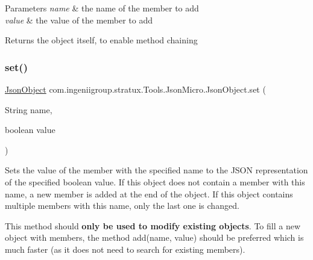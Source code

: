 \begin{DoxyParams}{Parameters}
{\em name} & the name of the member to add \\
\hline
{\em value} & the value of the member to add \\
\hline
\end{DoxyParams}
\begin{DoxyReturn}{Returns}
the object itself, to enable method chaining 
\end{DoxyReturn}
\mbox{\label{classcom_1_1ingeniigroup_1_1stratux_1_1_tools_1_1_json_micro_1_1_json_object_aaa3a26ae6e7d50c2a4ba84cff7bebad6}} 
\subsubsection{\texorpdfstring{set()}{set()}\hspace{0.1cm}{\footnotesize\ttfamily [5/7]}}
{\footnotesize\ttfamily \hyperlink{classcom_1_1ingeniigroup_1_1stratux_1_1_tools_1_1_json_micro_1_1_json_object}{Json\+Object} com.\+ingeniigroup.\+stratux.\+Tools.\+Json\+Micro.\+Json\+Object.\+set (\begin{DoxyParamCaption}\item[{String}]{name,  }\item[{boolean}]{value }\end{DoxyParamCaption})}

Sets the value of the member with the specified name to the J\+S\+ON representation of the specified {\ttfamily boolean} value. If this object does not contain a member with this name, a new member is added at the end of the object. If this object contains multiple members with this name, only the last one is changed. 

This method should {\bfseries only be used to modify existing objects}. To fill a new object with members, the method {\ttfamily add(name, value)} should be preferred which is much faster (as it does not need to search for existing members). 


